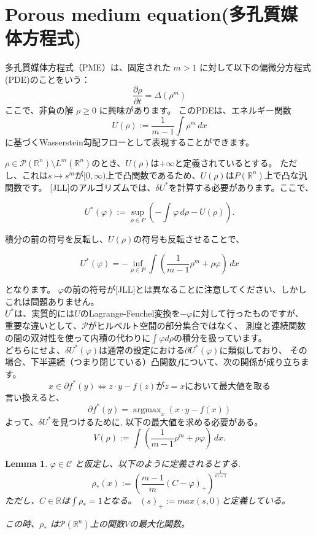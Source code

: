 \documentclass{jsarticle}
\newtheorem{lem}[thm]{Lemma}
\theoremstyle{definition}
\begin{document}
\section{Porous medium equation(多孔質媒体方程式)}

多孔質媒体方程式（PME）は、固定された \(m > 1\) に対して以下の偏微分方程式(PDE)のことをいう：
\[
\frac{{\partial \rho}}{{\partial t}} = \Delta (\rho^m)
\]
ここで、非負の解 \(\rho \geq 0\) に興味があります。
このPDEは、エネルギー関数
\[
U(\rho) := \frac{1}{{m-1}} \int \rho^m \, dx
\]
に基づくWasserstein勾配フローとして表現することができます。

$\rho \in \mathcal{P}(\mathbb{R}^n) \setminus L^m(\mathbb{R}^n)$のとき、$U(\rho)$は$+\infty$と定義されているとする。
ただし、これは$s \mapsto s^m$が$[0, \infty)$上で凸関数であるため、$U(\rho)$は$P(\mathbb{R}^n)$上で凸な汎関数です。
[JLL]のアルゴリズムでは、$\delta U^*$を計算する必要があります。ここで、

$$
  U^*(\varphi) := \sup_{\rho \in P} \left( -\int \varphi \, d\rho - U(\rho) \right).
$$

積分の前の符号を反転し、$U(\rho)$の符号も反転させることで、

$$
U^*(\varphi) = -\inf_{\rho \in P} \int \left(\frac{1}{m-1}\rho^m + \rho\varphi\right) \, dx
$$

となります。
$\varphi$の前の符号が[JLL]とは異なることに注意してください、しかしこれは問題ありません。\\

$U^*$は、実質的には$U$のLagrange-Fenchel変換を$-\varphi$に対して行ったものですが、
重要な違いとして、$\mathcal{P}$がヒルベルト空間の部分集合ではなく、
測度と連続関数の間の双対性を使って内積の代わりに$\int \varphi d \rho$の積分を扱っています。\\

{\color{teal}
どちらにせよ、$\delta U^*(\varphi)$は通常の設定における$\partial U^*(\varphi)$に類似しており、
その場合、下半連続（つまり閉じている）凸関数$f$について、次の関係が成り立ちます。}
\[
  x \in \partial f^*(y) \iff z \cdot y - f(z) \text{が} z = x \text{において最大値を取る}
\]
言い換えると、
\[
  \partial f^*(y) = \operatorname{argmax}_x (x \cdot y - f(x))
\]
{\color{teal}
よって、$\delta U^*$を見つけるために, 以下の最大値を求める必要がある。
\[
  V(\rho) := \int \left(\frac{1}{m-1}\rho^m + \rho\varphi\right) \, dx.
\]
}
\vspace\baselineskip 

\begin{lem}
  $\varphi \in \mathcal{C}$ と仮定し、以下のように定義されるとする.
  $$
    \rho_*(x) := \left( \frac{m-1}{m}(C - \varphi)_+ \right)^{\frac{1}{m-1}} 
  $$
  ただし、$C \in \mathbb{R}$は$\int \rho_* = 1$となる。
  $(s)_+ := max(s, 0)$と定義している。

  この時、$\rho_*$ は$\mathcal{P}(\mathbb{R}^n)$上の関数$V$の最大化関数。
\end{lem}
\end{document}
